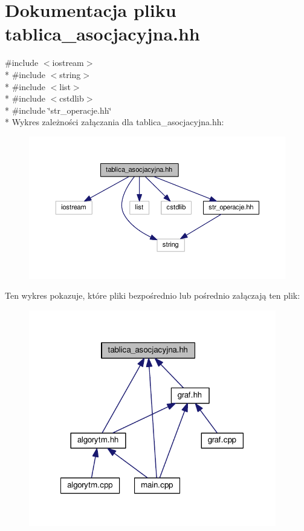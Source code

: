 \hypertarget{tablica__asocjacyjna_8hh}{\section{Dokumentacja pliku tablica\-\_\-asocjacyjna.\-hh}
\label{tablica__asocjacyjna_8hh}
}
{\ttfamily \#include $<$iostream$>$}\\*
{\ttfamily \#include $<$string$>$}\\*
{\ttfamily \#include $<$list$>$}\\*
{\ttfamily \#include $<$cstdlib$>$}\\*
{\ttfamily \#include \char`\"{}str\-\_\-operacje.\-hh\char`\"{}}\\*
Wykres zależności załączania dla tablica\-\_\-asocjacyjna.\-hh\-:\nopagebreak
\begin{figure}[H]
\begin{center}
\leavevmode
\includegraphics[width=350pt]{tablica__asocjacyjna_8hh__incl}
\end{center}
\end{figure}
Ten wykres pokazuje, które pliki bezpośrednio lub pośrednio załączają ten plik\-:\nopagebreak
\begin{figure}[H]
\begin{center}
\leavevmode
\includegraphics[width=306pt]{tablica__asocjacyjna_8hh__dep__incl}
\end{center}
\end{figure}
